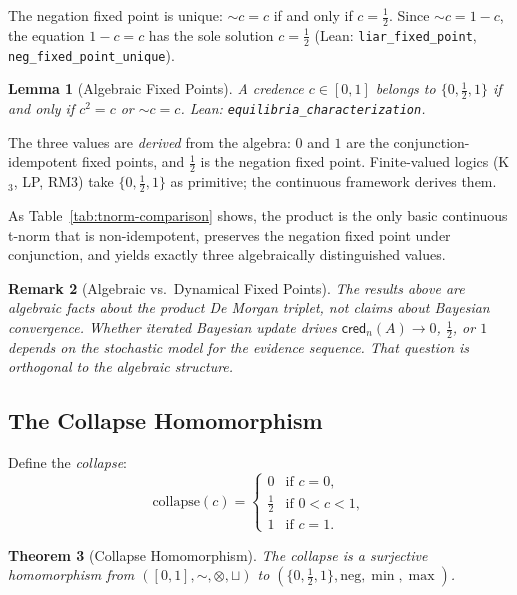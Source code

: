 \documentclass[11pt,a4paper]{article}
\newtheorem{theorem}{Theorem}[section]
\newtheorem{lemma}[theorem]{Lemma}
\newtheorem{remark}[theorem]{Remark}
\newcommand{\cred}{\mathsf{cred}}
\newcommand{\negc}{\mathord{\sim}}
\newcommand{\conjc}{\otimes}
\newcommand{\disjc}{\sqcup}
\begin{document}
The negation fixed point is unique: $\negc c = c$ if and only if
$c = \tfrac{1}{2}$.
Since $\negc c = 1 - c$, the equation $1 - c = c$ has the sole
solution $c = \tfrac{1}{2}$
(Lean: \texttt{liar\_fixed\_point},
\texttt{neg\_fixed\_point\_unique}).

\begin{lemma}[Algebraic Fixed Points]
\label{prop:equilibria}
A credence $c \in [0,1]$ belongs to $\{0, \tfrac{1}{2}, 1\}$ if and
only if $c^2 = c$ or $\negc c = c$.
Lean: \texttt{equilibria\_characterization}.
\end{lemma}

The three values are \emph{derived} from the algebra: $0$ and $1$
are the conjunction-idempotent fixed points, and $\tfrac{1}{2}$ is
the negation fixed point.
Finite-valued logics (K$_3$, LP, RM3) take $\{0, \tfrac{1}{2}, 1\}$
as primitive; the continuous framework derives them.

As Table~\ref{tab:tnorm-comparison} shows, the product is the only
basic continuous t-norm that is non-idempotent, preserves the
negation fixed point under conjunction, and yields exactly three
algebraically distinguished values.

\begin{remark}[Algebraic vs.\ Dynamical Fixed Points]
\label{rem:algebraic-vs-dynamical}
The results above are algebraic facts about the product De Morgan
triplet, not claims about Bayesian convergence.
Whether iterated Bayesian update drives $\cred_n(A) \to 0$,
$\tfrac{1}{2}$, or $1$ depends on the stochastic model for the
evidence sequence. That question is orthogonal to the algebraic structure.
\end{remark}

\subsection{The Collapse Homomorphism}
\label{sec:collapse-hom}

Define the \emph{collapse}:
\[
\mathrm{collapse}(c) = \begin{cases}
0 & \text{if } c = 0, \\
\tfrac{1}{2} & \text{if } 0 < c < 1, \\
1 & \text{if } c = 1.
\end{cases}
\]

\begin{theorem}[Collapse Homomorphism]
\label{thm:collapse}
The collapse is a surjective homomorphism from
$([0,1], \negc, \conjc, \disjc)$ to
$(\{0, \tfrac{1}{2}, 1\}, \mathrm{neg}, \min, \max)$.
\end{theorem}
\end{document}
